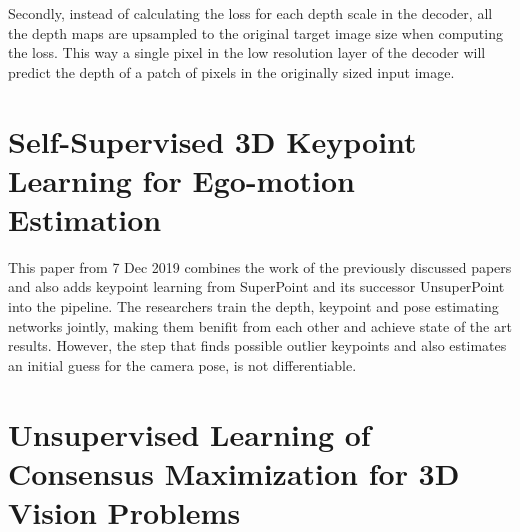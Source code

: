 Secondly, instead of calculating the loss for each depth scale in the decoder, all the depth maps are upsampled to the original target image size when computing the loss. This way a single pixel in the low resolution layer of the decoder will predict the depth of a patch of pixels in the originally sized input image.

\section{Self-Supervised 3D Keypoint Learning for Ego-motion Estimation \cite{keypointdepth}}

This paper from 7 Dec 2019 combines the work of the previously discussed papers and also adds keypoint learning from SuperPoint\cite{superpoint} and its successor UnsuperPoint\cite{unsuperpoint} into the pipeline.
The researchers train the depth, keypoint and pose estimating networks jointly, making them benifit from each other and achieve state of the art results. However, the step that finds possible outlier keypoints and also estimates an initial guess for the camera pose, is not differentiable.

\section{Unsupervised Learning of Consensus Maximization for 3D Vision Problems}

